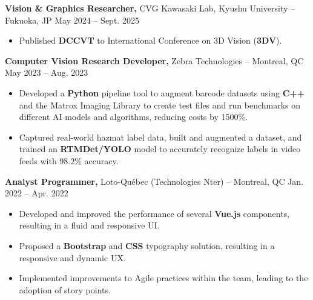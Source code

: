 \documentclass[11pt]{article}       %
\begin{document}
\textbf{Vision \& Graphics Researcher,} {CVG Kawasaki Lab, Kyushu University} -- Fukuoka, JP \hfill May 2024 -- Sept. 2025 \\
\vspace{-9pt}
\begin{itemize}
      \item Published \textbf{DCCVT} to International Conference on 3D Vision
            (\textbf{3DV}).
\end{itemize}

\textbf{Computer Vision Research Developer,} {Zebra Technologies} -- Montreal, QC \hfill May 2023 -- Aug. 2023 \\
\vspace{-9pt}
\begin{itemize}
      \item Developed a \textbf{Python} pipeline tool to augment barcode datasets using
            \textbf{C++} and the Matrox Imaging Library to create test files and run
            benchmarks on different AI models and algorithms, reducing costs by 1500\%.
      \item Captured real-world hazmat label data, built and augmented a dataset, and
            trained an \textbf{RTMDet/YOLO} model to accurately recognize labels in video
            feeds with 98.2\% accuracy.
\end{itemize}

\textbf{Analyst Programmer,} {Loto-Québec (Technologies Nter)} -- Montreal, QC \hfill Jan. 2022 -- Apr. 2022 \\
\vspace{-9pt}
\begin{itemize}
      \item Developed and improved the performance of several \textbf{Vue.js} components,
            resulting in a fluid and responsive UI.
      \item Proposed a \textbf{Bootstrap} and \textbf{CSS} typography solution, resulting
            in a responsive and dynamic UX.
      \item Implemented improvements to Agile practices within the team, leading to the
            adoption of story points.
\end{itemize}

\end{document}
